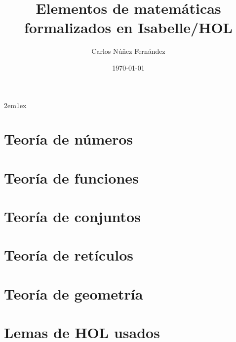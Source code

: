 \documentclass[12pt,a4paper,twoside]{book}
\begin{document}
\title{Elementos de matemáticas formalizados en Isabelle/HOL}
\author{Carlos Núñez Fernández}
\date{\today}
\maketitle


\tableofcontents

\parindent 2em\parskip 1ex

% 


\chapter{Teoría de números}


\chapter{Teoría de funciones}


\chapter{Teoría de conjuntos}

\chapter{Teoría de retículos}

\chapter{Teoría de geometría}


\appendix

\chapter{Lemas de HOL usados}


\nocite{LMF, tutorial, Isabelle}



\todototoc
\listoftodos
\end{document}
